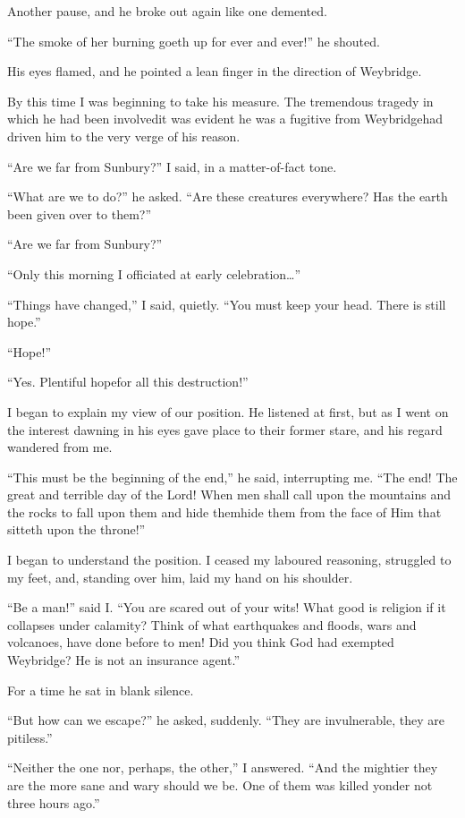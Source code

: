 Another pause, and he broke out again like one demented.

``The smoke of her burning goeth up for ever and ever!'' he shouted.

His eyes flamed, and he pointed a lean finger in the direction of
Weybridge.

By this time I was beginning to take his measure. The tremendous
tragedy in which he had been involved\dash{}it was evident he was a
fugitive from Weybridge\dash{}had driven him to the very verge of his
reason.

``Are we far from Sunbury?'' I said, in a matter-of-fact tone.

``What are we to do?'' he asked. ``Are these creatures everywhere? Has
the earth been given over to them?''

``Are we far from Sunbury?''

``Only this morning I officiated at early celebration\ldots{}''

``Things have changed,'' I said, quietly. ``You must keep your head.
There is still hope.''

``Hope!''

``Yes. Plentiful hope\dash{}for all this destruction!''

I began to explain my view of our position. He listened at first,
but as I went on the interest dawning in his eyes gave place to
their former stare, and his regard wandered from me.

``This must be the beginning of the end,'' he said, interrupting me.
``The end! The great and terrible day of the Lord! When men shall
call upon the mountains and the rocks to fall upon them and hide
them\dash{}hide them from the face of Him that sitteth upon the
throne!''

I began to understand the position. I ceased my laboured reasoning,
struggled to my feet, and, standing over him, laid my hand on his
shoulder.

``Be a man!'' said I. ``You are scared out of your wits! What good is
religion if it collapses under calamity? Think of what earthquakes
and floods, wars and volcanoes, have done before to men! Did you
think God had exempted Weybridge? He is not an insurance agent.''

For a time he sat in blank silence.

``But how can we escape?'' he asked, suddenly. ``They are
invulnerable, they are pitiless.''

``Neither the one nor, perhaps, the other,'' I answered. ``And the
mightier they are the more sane and wary should we be. One of them
was killed yonder not three hours ago.''

